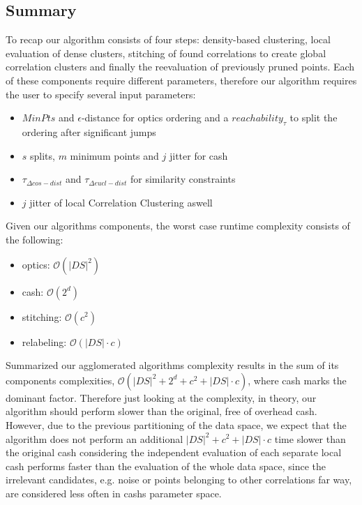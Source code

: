 \subsection{Summary}
To recap our algorithm consists of four steps: density-based clustering, local evaluation of dense clusters, stitching of found correlations to create global correlation clusters and finally the reevaluation of previously pruned points. Each of these components require different parameters, therefore our algorithm requires the user to specify several input parameters:
\begin{itemize}[label={\tiny\raisebox{1ex}{\textbullet}},topsep=6pt,itemsep=-1ex,partopsep=2ex,parsep=2ex]
    \item {} $MinPts$ and $\epsilon$-distance for \gls{optics} ordering and a $reachability_{\tau}$ to split the ordering after significant jumps
    \item {} $s$ splits, $m$ minimum points and $j$ jitter for \gls{cash}
    \item {} $\tau_{\Delta cos-dist}$ and $\tau_{\Delta eucl-dist}$ for similarity constraints
    \item {} $j$ jitter of local Correlation Clustering aswell
\end{itemize}
Given our algorithms components, the worst case runtime complexity consists of the following:
\begin{itemize}[label={\tiny\raisebox{1ex}{\textbullet}},topsep=6pt,itemsep=-1ex,partopsep=2ex,parsep=2ex]
    \item \gls{optics}: $\mathcal{O}(|DS|^2)$
    \item \gls{cash}: $\mathcal{O}(2^d)$
    \item stitching: $\mathcal{O}(c^2)$
    \item relabeling: $\mathcal{O}(|DS| \cdot c)$
\end{itemize}

Summarized our agglomerated algorithms complexity results in the sum of its components complexities, $\mathcal{O}(|DS|^2+2^d+c^2+|DS|\cdot c)$, where \gls{cash} marks the dominant factor.
Therefore just looking at the complexity, in theory, our algorithm should perform slower than the original, free of overhead \gls{cash}. However, due to the previous partitioning of the data space, we expect that the algorithm does not perform an additional $|DS|^2+c^2+|DS|\cdot c$ time slower than the original \gls{cash} considering the independent evaluation of each separate local \gls{cash} performs faster than the evaluation of the whole data space, since the irrelevant candidates, e.g. noise or points belonging to other correlations far way, are considered less often in \gls{cash}s parameter space.

